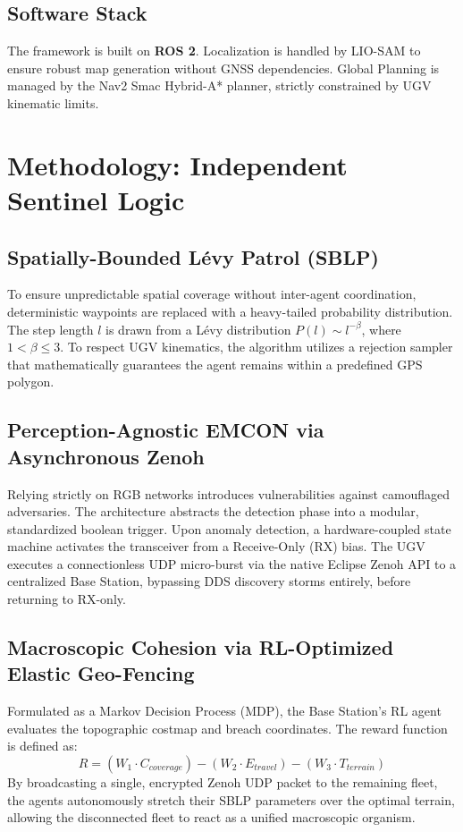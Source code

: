 \documentclass[conference]{IEEEtran}
\begin{document}
\subsection{Software Stack}
The framework is built on \textbf{ROS 2}. Localization is handled by LIO-SAM to ensure robust map generation without GNSS dependencies. Global Planning is managed by the Nav2 Smac Hybrid-A* planner, strictly constrained by UGV kinematic limits.

\section{Methodology: Independent Sentinel Logic}

\subsection{Spatially-Bounded Lévy Patrol (SBLP)}
To ensure unpredictable spatial coverage without inter-agent coordination, deterministic waypoints are replaced with a heavy-tailed probability distribution. The step length $l$ is drawn from a Lévy distribution $P(l) \sim l^{-\beta}$, where $1 < \beta \le 3$. To respect UGV kinematics, the algorithm utilizes a rejection sampler that mathematically guarantees the agent remains within a predefined GPS polygon.

\subsection{Perception-Agnostic EMCON via Asynchronous Zenoh}
Relying strictly on RGB networks introduces vulnerabilities against camouflaged adversaries. The architecture abstracts the detection phase into a modular, standardized boolean trigger. Upon anomaly detection, a hardware-coupled state machine activates the transceiver from a Receive-Only (RX) bias. The UGV executes a connectionless UDP micro-burst via the native Eclipse Zenoh API to a centralized Base Station, bypassing DDS discovery storms entirely, before returning to RX-only.

\subsection{Macroscopic Cohesion via RL-Optimized Elastic Geo-Fencing}
Formulated as a Markov Decision Process (MDP), the Base Station's RL agent evaluates the topographic costmap and breach coordinates. The reward function is defined as:
$$R = (W_1 \cdot C_{coverage}) - (W_2 \cdot E_{travel}) - (W_3 \cdot T_{terrain})$$
By broadcasting a single, encrypted Zenoh UDP packet to the remaining fleet, the agents autonomously stretch their SBLP parameters over the optimal terrain, allowing the disconnected fleet to react as a unified macroscopic organism.
\end{document}
